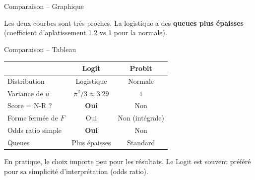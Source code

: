 \documentclass[11pt,aspectratio=169]{beamer}
\begin{document}
\begin{frame}{Comparaison -- Graphique}

\begin{center}
\end{center}

Les deux courbes sont très proches. La logistique a des \textbf{queues plus
épaisses} (coefficient d'aplatissement 1.2 vs 1 pour la normale).

\end{frame}

\begin{frame}{Comparaison -- Tableau}

\begin{center}
    \small
    \renewcommand{\arraystretch}{1.3}
    \begin{tabular}{lcc}
        \toprule
        & \textbf{Logit} & \textbf{Probit} \\
        \midrule
        Distribution & Logistique & Normale \\
        Variance de $u$ & $\pi^2/3 \approx 3.29$ & $1$ \\
        Score = N-R ? & \textbf{Oui} & Non \\
        Forme fermée de $F$ & Oui & Non (intégrale) \\
        Odds ratio simple & \textbf{Oui} & Non \\
        Queues & Plus épaisses & Standard \\
        \bottomrule
    \end{tabular}
\end{center}

En pratique, le choix importe peu pour les résultats. Le Logit est souvent
préféré pour sa simplicité d'interprétation (odds ratio).

\end{frame}
\end{document}
